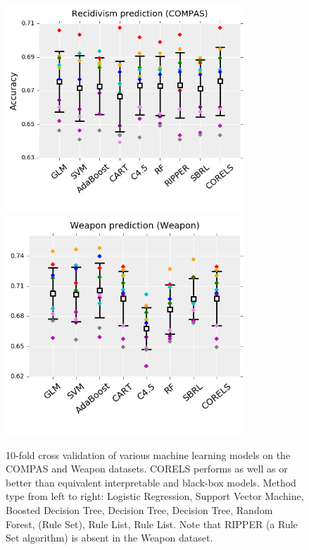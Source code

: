 \begin{figure}
\vspace{-2cm}
\begin{center}
\begin{minipage}{\textwidth}
\includegraphics[width=0.8\textwidth]{figs/compas_accuracy.png}
\includegraphics[width=0.8\textwidth]{figs/weapon_accuracy.png}
\vspace{-1cm}
\caption{10-fold cross validation of various machine learning models on the COMPAS and Weapon datasets.
CORELS performs as well as or better than equivalent interpretable and black-box models.
Method type from left to right: Logistic Regression, Support Vector Machine, Boosted Decision Tree, Decision Tree, Decision Tree, Random Forest, (Rule Set), Rule List, Rule List.
Note that RIPPER (a Rule Set algorithm) is absent in the Weapon dataset.
}
\label{fig:accuracy}
\end{minipage}
\end{center}
\end{figure}

